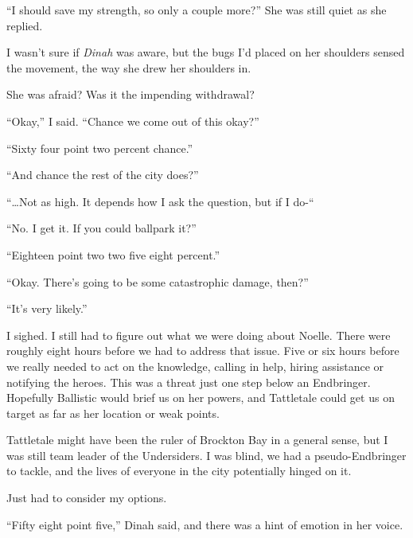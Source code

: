 ``I should save my strength, so only a couple more?''  She was still quiet as she replied.



I wasn't sure if \emph{Dinah} was aware, but the bugs I'd placed on her shoulders sensed the movement, the way she drew her shoulders in.



She was afraid?  Was it the impending withdrawal?



``Okay,'' I said.  ``Chance we come out of this okay?''



``Sixty four point two percent chance.''



``And chance the rest of the city does?''



``\ldots{}Not as high.  It depends how I ask the question, but if I do-``



``No.  I get it.  If you could ballpark it?''



``Eighteen point two two five eight percent.''



``Okay.  There's going to be some catastrophic damage, then?''



``It's very likely.''



I sighed.  I still had to figure out what we were doing about Noelle.  There were roughly eight hours before we had to address that issue.  Five or six hours before we really needed to act on the knowledge, calling in help, hiring assistance or notifying the heroes.  This was a threat just one step below an Endbringer.  Hopefully Ballistic would brief us on her powers, and Tattletale could get us on target as far as her location or weak points.



Tattletale might have been the ruler of Brockton Bay in a general sense, but I was still team leader of the Undersiders.  I was blind, we had a pseudo-Endbringer to tackle, and the lives of everyone in the city potentially hinged on it.



Just had to consider my options.



``Fifty eight point five,'' Dinah said, and there was a hint of emotion in her voice.



